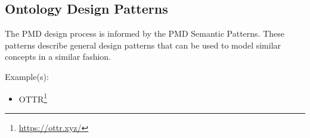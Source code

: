\subsection{Ontology Design Patterns}

The PMD design process is informed by the PMD Semantic Patterns. These patterns describe general design patterns that can be used to model similar concepts in a similar fashion. 

Example(s): 
\begin{itemize}
    \item OTTR\footnote{\url{https://ottr.xyz/}}
\end{itemize}